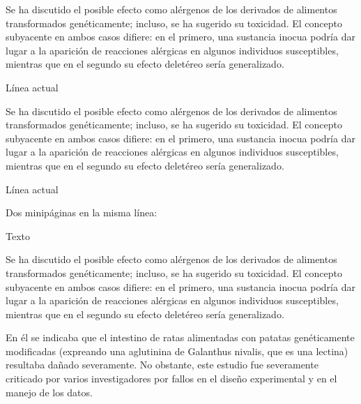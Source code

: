 \documentclass[11pt,twoside]{article}
\begin{document}
 \begin{minipage}[c]{7cm}
Se ha discutido el posible efecto como alérgenos de los derivados de alimentos transformados genéticamente; incluso, se ha sugerido su toxicidad. El concepto subyacente en ambos casos difiere: en el primero, una sustancia inocua podría dar lugar a la aparición de reacciones alérgicas en algunos individuos susceptibles, mientras que en el segundo su efecto deletéreo sería generalizado. 
\end{minipage} 

\bigskip
Línea actual  \begin{minipage}[t]{7cm}
Se ha discutido el posible efecto como alérgenos de los derivados de alimentos transformados genéticamente; incluso, se ha sugerido su toxicidad. El concepto subyacente en ambos casos difiere: en el primero, una sustancia inocua podría dar lugar a la aparición de reacciones alérgicas en algunos individuos susceptibles, mientras que en el segundo su efecto deletéreo sería generalizado. 
\end{minipage} 
Línea actual

\bigskip 

Dos minipáginas en la misma línea:

\bigskip 
Texto \begin{minipage}[t]{5cm}
Se ha discutido el posible efecto como alérgenos de los derivados de alimentos transformados genéticamente; incluso, se ha sugerido su toxicidad. El concepto subyacente en ambos casos difiere: en el primero, una sustancia inocua podría dar lugar a la aparición de reacciones alérgicas en algunos individuos susceptibles, mientras que en el segundo su efecto deletéreo sería generalizado. 
\end{minipage}
%
\hfill
%
\begin{minipage}[t]{5cm}
En él se indicaba que el intestino de ratas alimentadas con patatas genéticamente modificadas (expreando una aglutinina de Galanthus nivalis, que es una lectina) resultaba dañado severamente.
No obstante, este estudio fue severamente criticado por varios investigadores por fallos en el diseño experimental y en el manejo de los datos.\end{minipage} 
\end{document}
